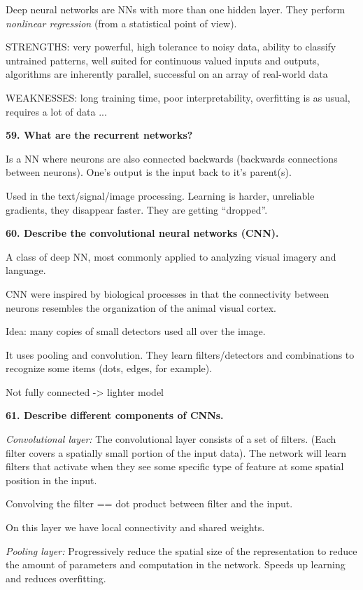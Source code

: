 Deep neural networks are NNs with more than one hidden layer. They
perform \emph{nonlinear regression} (from a statistical point of view).

STRENGTHS: very powerful, high tolerance to noisy data, ability to
classify untrained patterns, well suited for continuous valued inputs
and outputs, algorithms are inherently parallel, successful on an array
of real-world data

WEAKNESSES: long training time, poor interpretability, overfitting is as
usual, requires a lot of data ...

\textbf{59. What are the recurrent networks?}

Is a NN where neurons are also connected backwards (backwards
connections between neurons). One's output is the input back to it's
parent(s).

Used in the text/signal/image processing. Learning is harder, unreliable
gradients, they disappear faster. They are getting ``dropped''.

\textbf{60. Describe the convolutional neural networks (CNN).}

A class of deep NN, most commonly applied to analyzing visual imagery
and language.

CNN were inspired by biological processes in that the connectivity
between neurons resembles the organization of the animal visual cortex.

Idea: many copies of small detectors used all over the image.

It uses pooling and convolution. They learn filters/detectors and
combinations to recognize some items (dots, edges, for example).

Not fully connected -\textgreater{} lighter model

\textbf{61. Describe different components of CNNs.}

\textit{Convolutional layer:} The convolutional layer consists of a
set of filters. (Each filter covers a spatially small portion of the
input data). The network will learn filters that activate when they see
some specific type of feature at some spatial position in the input.

Convolving the filter == dot product between filter and the input.

On this layer we have local connectivity and shared weights.

\textit{Pooling layer:} Progressively reduce the spatial size of the
representation to reduce the amount of parameters and computation in the
network. Speeds up learning and reduces overfitting.

